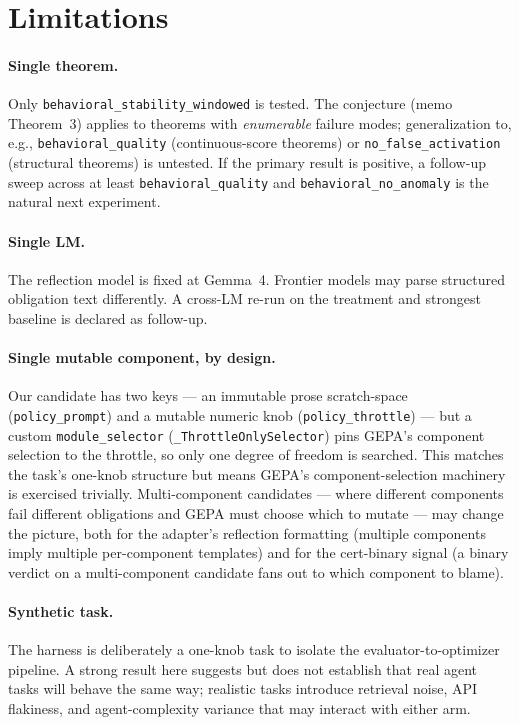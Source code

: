 \section{Limitations}\label{sec:limits}

\paragraph{Single theorem.}  Only
\texttt{behavioral\_stability\_windowed} is tested.  The conjecture
(memo Theorem~3) applies to theorems with \emph{enumerable} failure
modes; generalization to, e.g., \texttt{behavioral\_quality}
(continuous-score theorems) or \texttt{no\_false\_activation}
(structural theorems) is untested.  If the primary result is
positive, a follow-up sweep across at least
\texttt{behavioral\_quality} and \texttt{behavioral\_no\_anomaly}
is the natural next experiment.

\paragraph{Single LM.}  The reflection model is fixed at Gemma~4.
Frontier models may parse structured obligation text differently.
A cross-LM re-run on the treatment and strongest baseline is
declared as follow-up.

\paragraph{Single mutable component, by design.}  Our candidate has
two keys --- an immutable prose scratch-space
(\texttt{policy\_prompt}) and a mutable numeric knob
(\texttt{policy\_throttle}) --- but a custom
\texttt{module\_selector} (\texttt{\_ThrottleOnlySelector}) pins
GEPA's component selection to the throttle, so only one degree of
freedom is searched.  This matches the task's one-knob structure
but means GEPA's component-selection machinery is exercised
trivially.  Multi-component candidates --- where different
components fail different obligations and GEPA must choose which to
mutate --- may change the picture, both for the adapter's reflection
formatting (multiple components imply multiple per-component
templates) and for the cert-binary signal (a binary verdict on a
multi-component candidate fans out to which component to blame).

\paragraph{Synthetic task.}  The harness is deliberately a
one-knob task to isolate the evaluator-to-optimizer pipeline.  A
strong result here suggests but does not establish that real
agent tasks will behave the same way; realistic tasks introduce
retrieval noise, API flakiness, and agent-complexity variance
that may interact with either arm.


